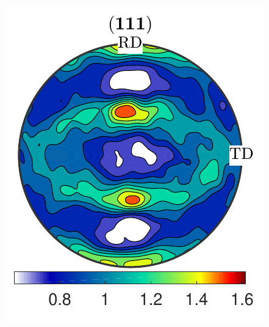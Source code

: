 \documentclass[compress]{beamer}
\begin{document}
\begin{frame}[fragile]
\begin{columns}
\begin{column}{0.29\textwidth}
\begin{onlyenv}
      \includegraphics[width=\textwidth]{pic/rolling111_3}
    \end{onlyenv}


\end{column}
\end{columns}
\end{frame}
\end{document}
